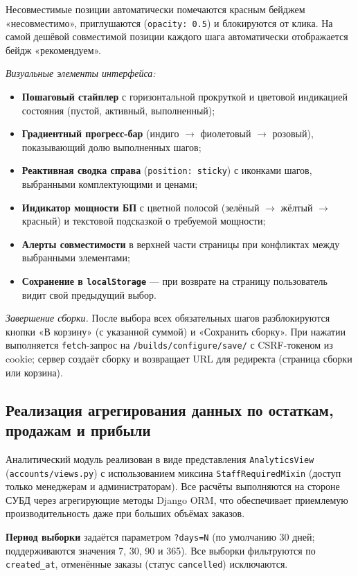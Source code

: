 Несовместимые позиции автоматически помечаются красным бейджем «несовместимо», приглушаются (\texttt{opacity: 0.5}) и блокируются от клика. На самой дешёвой совместимой позиции каждого шага автоматически отображается бейдж «рекомендуем».

\emph{Визуальные элементы интерфейса:}
\begin{itemize}
    \item \textbf{Пошаговый стайплер} с горизонтальной прокруткой и цветовой индикацией состояния (пустой, активный, выполненный);
    \item \textbf{Градиентный прогресс-бар} (индиго $\rightarrow$ фиолетовый $\rightarrow$ розовый), показывающий долю выполненных шагов;
    \item \textbf{Реактивная сводка справа} (\texttt{position: sticky}) с иконками шагов, выбранными комплектующими и ценами;
    \item \textbf{Индикатор мощности БП} с цветной полосой (зелёный $\rightarrow$ жёлтый $\rightarrow$ красный) и текстовой подсказкой о требуемой мощности;
    \item \textbf{Алерты совместимости} в верхней части страницы при конфликтах между выбранными элементами;
    \item \textbf{Сохранение в \texttt{localStorage}} --- при возврате на страницу пользователь видит свой предыдущий выбор.
\end{itemize}

\emph{Завершение сборки.} После выбора всех обязательных шагов разблокируются кнопки «В корзину» (с указанной суммой) и «Сохранить сборку». При нажатии выполняется \texttt{fetch}-запрос на \texttt{/builds/configure/save/} с CSRF-токеном из cookie; сервер создаёт сборку и возвращает URL для редиректа (страница сборки или корзина).

\subsection{Реализация агрегирования данных по остаткам, продажам и прибыли}

Аналитический модуль реализован в виде представления \texttt{AnalyticsView} (\texttt{accounts/views.py}) с использованием миксина \texttt{StaffRequiredMixin} (доступ только менеджерам и администраторам). Все расчёты выполняются на стороне СУБД через агрегирующие методы Django ORM, что обеспечивает приемлемую производительность даже при больших объёмах заказов.

\textbf{Период выборки} задаётся параметром \texttt{?days=N} (по умолчанию 30 дней; поддерживаются значения 7, 30, 90 и 365). Все выборки фильтруются по \texttt{created\_at}, отменённые заказы (статус \texttt{cancelled}) исключаются.

